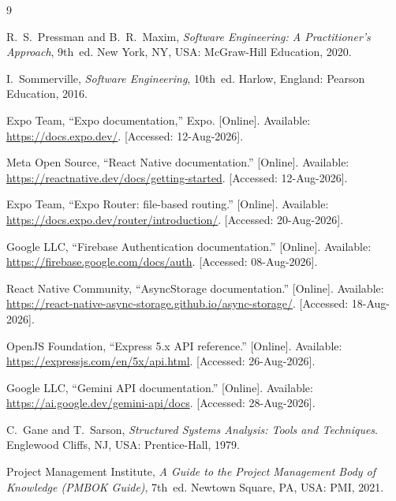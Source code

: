 \documentclass[12pt,a4paper,oneside]{report}
\begin{document}
\begin{thebibliography}{9}

R.~S.~Pressman and B.~R.~Maxim, \emph{Software Engineering: A Practitioner's
Approach}, 9th~ed. New York, NY, USA: McGraw-Hill Education, 2020.

I.~Sommerville, \emph{Software Engineering}, 10th~ed. Harlow, England: Pearson
Education, 2016.

Expo Team, ``Expo documentation,'' Expo. [Online]. Available:
\url{https://docs.expo.dev/}. [Accessed: 12-Aug-2026].

Meta Open Source, ``React Native documentation.'' [Online]. Available:
\url{https://reactnative.dev/docs/getting-started}. [Accessed: 12-Aug-2026].

Expo Team, ``Expo Router: file-based routing.'' [Online]. Available:
\url{https://docs.expo.dev/router/introduction/}. [Accessed: 20-Aug-2026].

Google LLC, ``Firebase Authentication documentation.'' [Online]. Available:
\url{https://firebase.google.com/docs/auth}. [Accessed: 08-Aug-2026].

React Native Community, ``AsyncStorage documentation.'' [Online]. Available:
\url{https://react-native-async-storage.github.io/async-storage/}. [Accessed: 18-Aug-2026].

OpenJS Foundation, ``Express 5.x API reference.'' [Online]. Available:
\url{https://expressjs.com/en/5x/api.html}. [Accessed: 26-Aug-2026].

Google LLC, ``Gemini API documentation.'' [Online]. Available:
\url{https://ai.google.dev/gemini-api/docs}. [Accessed: 28-Aug-2026].

C.~Gane and T.~Sarson, \emph{Structured Systems Analysis: Tools and Techniques}.
Englewood Cliffs, NJ, USA: Prentice-Hall, 1979.

Project Management Institute, \emph{A Guide to the Project Management Body of
Knowledge (PMBOK Guide)}, 7th~ed. Newtown Square, PA, USA: PMI, 2021.

\end{thebibliography}
\end{document}
